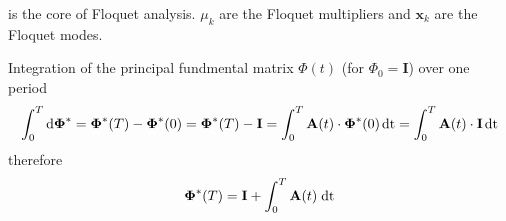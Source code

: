 \documentclass{article}
\begin{document}
is the core of Floquet analysis. $\mu_k$ are the Floquet multipliers and $\mathbf{x}_k$ are 
the Floquet modes.

Integration of the principal fundmental matrix $\Phi(t)$ (for $\Phi_0=\mathbf{I}$) over one 
period
\begin{equation}
 \int_0^T\mathrm{d\boldsymbol{\Phi}^*}=\boldsymbol{\Phi}^*(T)-\boldsymbol{\Phi}^*(0)=\boldsymbol{\Phi}^*(T)-\mathbf{I}
 =\int_0^T\mathbf{A}(t)\cdot\boldsymbol{\Phi}^*(0)\hspace{0.5mm}\mathrm{dt}
 =\int_0^T\mathbf{A}(t)\cdot\mathbf{I}\hspace{0.5mm}\mathrm{dt}%
\end{equation}
therefore
\begin{equation}
 \boldsymbol{\Phi}^*(T)=\mathbf{I}+\int_0^T\mathbf{A}(t)\hspace{1mm}\mathrm{dt}
 \label{eq:PhiT}
\end{equation}
\end{document}
